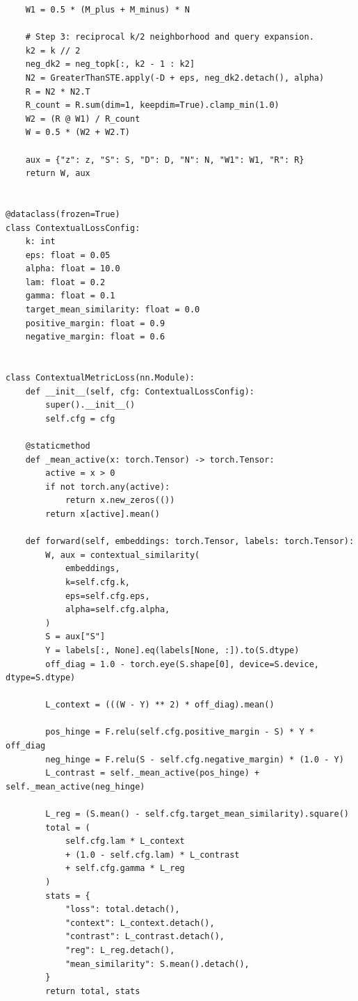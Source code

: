 \documentclass[11pt,oneside,openany]{book}
\theoremstyle{myplain}
\theoremstyle{definition}
\begin{document}
\begin{lstlisting}
    W1 = 0.5 * (M_plus + M_minus) * N

    # Step 3: reciprocal k/2 neighborhood and query expansion.
    k2 = k // 2
    neg_dk2 = neg_topk[:, k2 - 1 : k2]
    N2 = GreaterThanSTE.apply(-D + eps, neg_dk2.detach(), alpha)
    R = N2 * N2.T
    R_count = R.sum(dim=1, keepdim=True).clamp_min(1.0)
    W2 = (R @ W1) / R_count
    W = 0.5 * (W2 + W2.T)

    aux = {"z": z, "S": S, "D": D, "N": N, "W1": W1, "R": R}
    return W, aux


@dataclass(frozen=True)
class ContextualLossConfig:
    k: int
    eps: float = 0.05
    alpha: float = 10.0
    lam: float = 0.2
    gamma: float = 0.1
    target_mean_similarity: float = 0.0
    positive_margin: float = 0.9
    negative_margin: float = 0.6


class ContextualMetricLoss(nn.Module):
    def __init__(self, cfg: ContextualLossConfig):
        super().__init__()
        self.cfg = cfg

    @staticmethod
    def _mean_active(x: torch.Tensor) -> torch.Tensor:
        active = x > 0
        if not torch.any(active):
            return x.new_zeros(())
        return x[active].mean()

    def forward(self, embeddings: torch.Tensor, labels: torch.Tensor):
        W, aux = contextual_similarity(
            embeddings,
            k=self.cfg.k,
            eps=self.cfg.eps,
            alpha=self.cfg.alpha,
        )
        S = aux["S"]
        Y = labels[:, None].eq(labels[None, :]).to(S.dtype)
        off_diag = 1.0 - torch.eye(S.shape[0], device=S.device, dtype=S.dtype)

        L_context = (((W - Y) ** 2) * off_diag).mean()

        pos_hinge = F.relu(self.cfg.positive_margin - S) * Y * off_diag
        neg_hinge = F.relu(S - self.cfg.negative_margin) * (1.0 - Y)
        L_contrast = self._mean_active(pos_hinge) + self._mean_active(neg_hinge)

        L_reg = (S.mean() - self.cfg.target_mean_similarity).square()
        total = (
            self.cfg.lam * L_context
            + (1.0 - self.cfg.lam) * L_contrast
            + self.cfg.gamma * L_reg
        )
        stats = {
            "loss": total.detach(),
            "context": L_context.detach(),
            "contrast": L_contrast.detach(),
            "reg": L_reg.detach(),
            "mean_similarity": S.mean().detach(),
        }
        return total, stats
\end{lstlisting}
\end{document}
